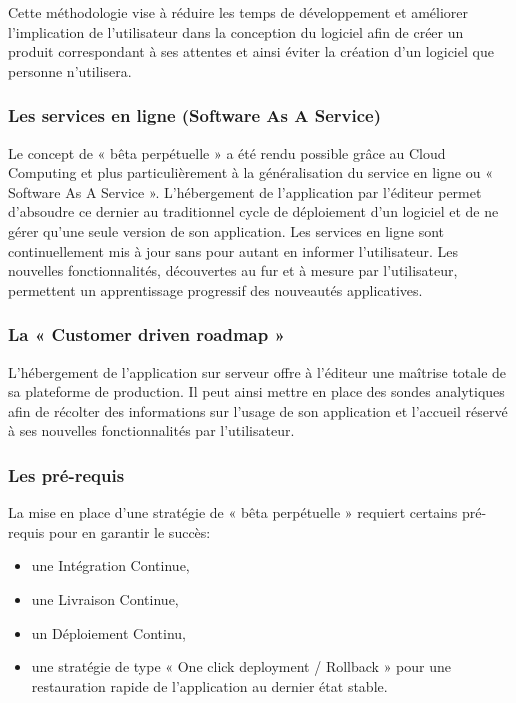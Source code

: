       Cette méthodologie vise à réduire les temps de développement et améliorer l’implication de l’utilisateur dans la conception du logiciel afin de créer un produit correspondant à ses attentes et ainsi éviter la création d’un logiciel que personne n’utilisera.

      \subsubsection{Les services en ligne (Software As A Service)}
      Le concept de « bêta perpétuelle » a été rendu possible grâce au Cloud Computing et plus particulièrement à la généralisation du service en ligne ou « Software As A Service ». L’hébergement de l’application par l’éditeur permet d’absoudre ce dernier au traditionnel cycle de déploiement d’un logiciel et de ne gérer qu’une seule version de son application. Les services en ligne sont continuellement mis à jour sans pour autant en informer l’utilisateur. Les nouvelles fonctionnalités, découvertes au fur et à mesure par l’utilisateur, permettent un apprentissage progressif des nouveautés applicatives.

      \subsubsection{La « Customer driven roadmap »}
      L’hébergement de l’application sur serveur offre à l’éditeur une maîtrise totale de sa plateforme de production. Il peut ainsi mettre en place des sondes analytiques afin de récolter des informations sur l’usage de son application et l’accueil réservé à ses nouvelles fonctionnalités par l’utilisateur.

      \subsubsection{Les pré-requis}
      La mise en place d’une stratégie de « bêta perpétuelle » requiert certains pré-requis pour en garantir le succès:\\
      \begin{itemize}
        \item une Intégration Continue,
        \item une Livraison Continue,
        \item un Déploiement Continu,
        \item une stratégie de type « One click deployment / Rollback » pour une restauration rapide de l’application au dernier état stable.\\
      \end{itemize}

